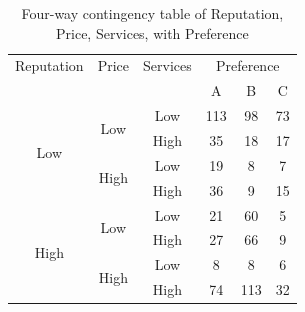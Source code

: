 \documentclass{article}
\begin{document}
\begin{table}[ht]
\centering
\begin{tabular}{|ccc|ccc|}
\toprule
Reputation & Price & Services & \multicolumn{3}{c|}{Preference} \\
 & & & A & B & C \\
\midrule
\multirow{4}{*}{Low}
    & \multirow{2}{*}{Low}
        & Low  & 113 & 98  & 73 \\
    & & High & 35  & 18  & 17 \\
    & \multirow{2}{*}{High}
        & Low  & 19  & 8   & 7  \\
    & & High & 36  & 9   & 15 \\
\midrule
\multirow{4}{*}{High}
    & \multirow{2}{*}{Low}
        & Low  & 21  & 60  & 5  \\
    & & High & 27  & 66  & 9  \\
    & \multirow{2}{*}{High}
        & Low  & 8   & 8   & 6  \\
    & & High & 74  & 113 & 32 \\
\bottomrule
\end{tabular}
\caption{Four-way contingency table of Reputation, Price, Services, with Preference}
\end{table}
\end{document}
